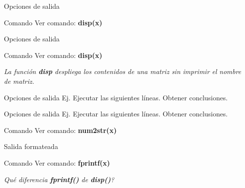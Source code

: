\documentclass{bredelebeamer}
\begin{document}
\begin{frame}{Opciones de salida}
\begin{exampleblock}{Comando}
Ver comando: \textbf{disp(x)}
\end{exampleblock}
\end{frame}

\begin{frame}{Opciones de salida}
\begin{exampleblock}{Comando}
Ver comando: \textbf{disp(x)}
\end{exampleblock}
\begin{center}
\textit{La función \textbf{disp} despliega los contenidos de una matriz sin imprimir el nombre de matriz.}
\end{center}
\end{frame}

\begin{frame}{Opciones de salida}
Ej. Ejecutar las siguientes líneas. Obtener conclusiones.

\end{frame}

\begin{frame}{Opciones de salida}
Ej. Ejecutar las siguientes líneas. Obtener conclusiones.

\begin{exampleblock}{Comando}
Ver comando: \textbf{num2str(x)}
\end{exampleblock}
\end{frame}

\begin{frame}{Salida formateada}
\begin{exampleblock}{Comando}
Ver comando: \textbf{fprintf(x)}
\end{exampleblock}
\begin{center}
\textit{Qué diferencia \textbf{fprintf()} de \textbf{disp()}?}
\end{center}
\end{frame}
\end{document}
